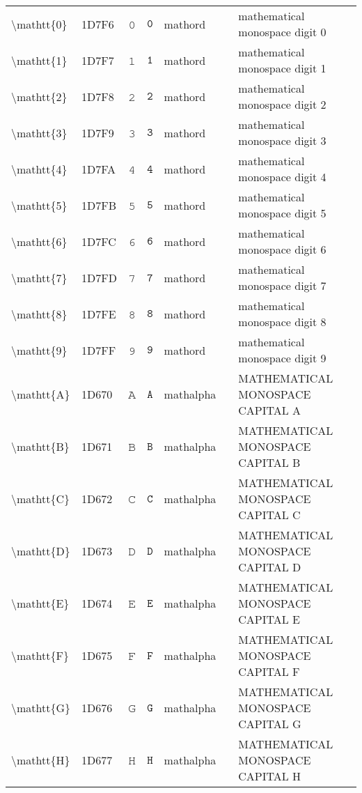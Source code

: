 \documentclass[a4paper,landscape]{article}
\begin{document}
\begin{longtable}{llcclll}
\textbackslash{}mathtt\{0\} & 1D7F6 & 𝟶 & $\mathtt{0}$ & mathord &  & mathematical monospace digit 0 \\
\textbackslash{}mathtt\{1\} & 1D7F7 & 𝟷 & $\mathtt{1}$ & mathord &  & mathematical monospace digit 1 \\
\textbackslash{}mathtt\{2\} & 1D7F8 & 𝟸 & $\mathtt{2}$ & mathord &  & mathematical monospace digit 2 \\
\textbackslash{}mathtt\{3\} & 1D7F9 & 𝟹 & $\mathtt{3}$ & mathord &  & mathematical monospace digit 3 \\
\textbackslash{}mathtt\{4\} & 1D7FA & 𝟺 & $\mathtt{4}$ & mathord &  & mathematical monospace digit 4 \\
\textbackslash{}mathtt\{5\} & 1D7FB & 𝟻 & $\mathtt{5}$ & mathord &  & mathematical monospace digit 5 \\
\textbackslash{}mathtt\{6\} & 1D7FC & 𝟼 & $\mathtt{6}$ & mathord &  & mathematical monospace digit 6 \\
\textbackslash{}mathtt\{7\} & 1D7FD & 𝟽 & $\mathtt{7}$ & mathord &  & mathematical monospace digit 7 \\
\textbackslash{}mathtt\{8\} & 1D7FE & 𝟾 & $\mathtt{8}$ & mathord &  & mathematical monospace digit 8 \\
\textbackslash{}mathtt\{9\} & 1D7FF & 𝟿 & $\mathtt{9}$ & mathord &  & mathematical monospace digit 9 \\
\textbackslash{}mathtt\{A\} & 1D670 & 𝙰 & $\mathtt{A}$ & mathalpha &  & MATHEMATICAL MONOSPACE CAPITAL A \\
\textbackslash{}mathtt\{B\} & 1D671 & 𝙱 & $\mathtt{B}$ & mathalpha &  & MATHEMATICAL MONOSPACE CAPITAL B \\
\textbackslash{}mathtt\{C\} & 1D672 & 𝙲 & $\mathtt{C}$ & mathalpha &  & MATHEMATICAL MONOSPACE CAPITAL C \\
\textbackslash{}mathtt\{D\} & 1D673 & 𝙳 & $\mathtt{D}$ & mathalpha &  & MATHEMATICAL MONOSPACE CAPITAL D \\
\textbackslash{}mathtt\{E\} & 1D674 & 𝙴 & $\mathtt{E}$ & mathalpha &  & MATHEMATICAL MONOSPACE CAPITAL E \\
\textbackslash{}mathtt\{F\} & 1D675 & 𝙵 & $\mathtt{F}$ & mathalpha &  & MATHEMATICAL MONOSPACE CAPITAL F \\
\textbackslash{}mathtt\{G\} & 1D676 & 𝙶 & $\mathtt{G}$ & mathalpha &  & MATHEMATICAL MONOSPACE CAPITAL G \\
\textbackslash{}mathtt\{H\} & 1D677 & 𝙷 & $\mathtt{H}$ & mathalpha &  & MATHEMATICAL MONOSPACE CAPITAL H \\

\end{longtable}
\end{document}
